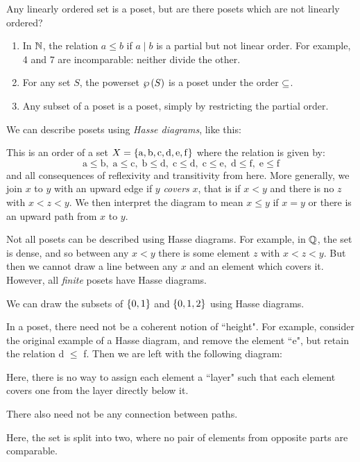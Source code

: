 \documentclass{article}
\begin{document}
\begin{example}[Posets]
    Any linearly ordered set is a poset, but are there posets which are not linearly ordered?
    \begin{enumerate}
	    \item In $\mathbb{N}$, the relation $a \leq b$ if $a \mid b$ is a partial but not linear order. For example, 4 and 7 are incomparable: neither divide the other.
	    \item For any set $S$, the powerset $\wp\left(S\right)$ is a poset under the order $\subseteq$.
	    \item Any subset of a poset is a poset, simply by restricting the partial order.
	\end{enumerate}
\end{example}

\begin{definition}
	\label{hasse-diagram}
    We can describe posets using \textit{Hasse diagrams}, like this:
    
    
	This is an order of a set $X = \left\lbrace \mathrm{a, b, c, d, e, f} \right\rbrace$ where the relation is given by:
	\[
	\mathrm{a \leq b, \; a \leq c, \; b \leq d, \; c \leq d, \; c \leq e, \; d \leq f, \; e \leq f}
	\]
	and all consequences of reflexivity and transitivity from here. More generally, we join $x$ to $y$ with an upward edge if $y$ \textit{covers} $x$, that is if $x < y$ and there is no $z$ with $x < z < y$. We then interpret the diagram to mean $x \leq y$ if $x = y$ or there is an upward path from $x$ to $y$.
\end{definition}

\begin{note}
    Not all posets can be described using Hasse diagrams. For example, in $\mathbb{Q}$, the set is dense, and so between any $x < y$ there is some element $z$ with $x < z < y$. But then we cannot draw a line between any $x$ and an element which covers it. However, all \textit{finite} posets have Hasse diagrams.
\end{note}

\begin{example}
    We can draw the subsets of $\left\lbrace 0, 1 \right\rbrace$ and $\left\lbrace 0, 1, 2 \right\rbrace$ using Hasse diagrams.
    
    
    In a poset, there need not be a coherent notion of ``height". For example, consider the original example of a Hasse diagram, and remove the element ``e", but retain the relation d $\leq$ f. Then we are left with the following diagram:
    
    
	Here, there is no way to assign each element a ``layer" such that each element covers one from the layer directly below it.
    
    There also need not be any connection between paths.
    
    
    Here, the set is split into two, where no pair of elements from opposite parts are comparable.
\end{example}
\end{document}
